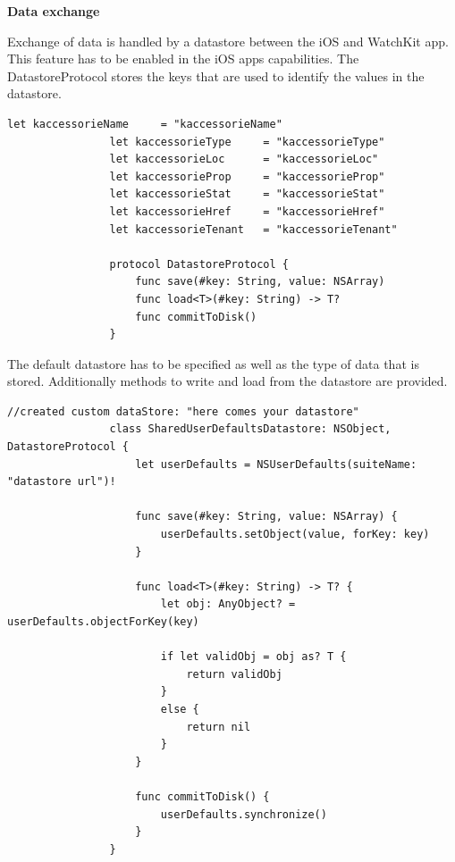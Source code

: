 	        	\pagebreak

			\textbf{Data exchange}

				Exchange of data is handled by a datastore between the iOS and WatchKit app. This feature has to be enabled in the iOS apps capabilities. The DatastoreProtocol stores the keys that are used to identify the values in the datastore.

				\begin{lstlisting}[caption=DataStore keys]
				let kaccessorieName     = "kaccessorieName"
				let kaccessorieType     = "kaccessorieType"
				let kaccessorieLoc      = "kaccessorieLoc"
				let kaccessorieProp     = "kaccessorieProp"
				let kaccessorieStat     = "kaccessorieStat"
				let kaccessorieHref     = "kaccessorieHref"
				let kaccessorieTenant   = "kaccessorieTenant"

				protocol DatastoreProtocol {
				    func save(#key: String, value: NSArray)
				    func load<T>(#key: String) -> T?
				    func commitToDisk()
				}
	        	\end{lstlisting}

	        	The default datastore has to be specified as well as the type of data that is stored. Additionally methods to write and load from the datastore are provided.

	        	\begin{lstlisting}[caption= Custom dataStore]
	        	//created custom dataStore: "here comes your datastore"
				class SharedUserDefaultsDatastore: NSObject, DatastoreProtocol {
				    let userDefaults = NSUserDefaults(suiteName: "datastore url")!
				    
				    func save(#key: String, value: NSArray) {
				        userDefaults.setObject(value, forKey: key)
				    }
				    
				    func load<T>(#key: String) -> T? {
				        let obj: AnyObject? = userDefaults.objectForKey(key)
				        
				        if let validObj = obj as? T {
				            return validObj
				        }
				        else {
				            return nil
				        }
				    }
				    
				    func commitToDisk() {
				        userDefaults.synchronize()
				    }
				}
	        	\end{lstlisting}

				\pagebreak


